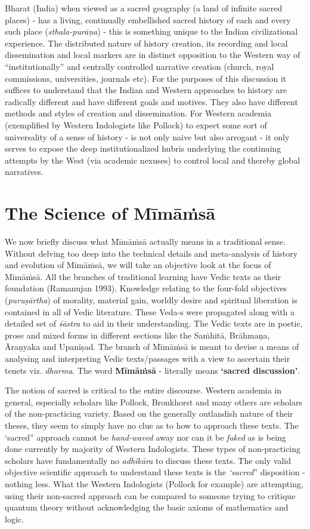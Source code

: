 Bharat (India) when viewed as a sacred geography (a land of infinite sacred places) - has a living, continually embellished sacred history of each and every such place (\textit{sthala-purāṇa}) - this is something unique to the Indian civilizational experience. The distributed nature of history creation, its recording and local dissemination and local markers are in distinct opposition to the Western way of “institutionally” and centrally controlled narrative creation (church, royal commissions, universities, journals etc). For the purposes of this discussion it suffices to understand that the Indian and Western approaches to history are radically different and have different goals and motives. They also have different methods and styles of creation and dissemination. For Western academia (exemplified by Western Indologists like Pollock) to expect some sort of universality of a sense of history - is not only naive but also arrogant - it only serves to expose the deep institutionalized hubris underlying the continuing attempts by the West (via academic nexuses) to control local and thereby global narratives.


\section*{The Science of Mīmāṁsā}

We now briefly discuss what Mīmāṁsā actually means in a traditional sense. Without delving too deep into the technical details and meta-analysis of history and evolution of Mīmāṁsā, we will take an objective look at the focus of Mīmāṁsā. All the branches of traditional learning have Vedic texts as their foundation (Ramanujan 1993). Knowledge relating to the four-fold objectives (\textit{puruṣārtha}) of morality, material gain, worldly desire and spiritual liberation is contained in all of Vedic literature. These Veda-s were propagated along with a detailed set of \textit{śāstra} to aid in their understanding. The Vedic texts are in poetic, prose and mixed forms in different sections like the Saṁhitā, Brāhmaṇa, Āraṇyaka and Upaniṣad. The branch of Mīmāṁsā is meant to devise a means of analysing and interpreting Vedic texts/passages with a view to ascertain their tenets viz. \textit{dharma}. The word \textbf{Mīmāṁsā} - literally means \textbf{‘sacred discussion’}.

The notion of sacred is critical to the entire discourse. Western academia in general, especially scholars like Pollock, Bronkhorst and many others are scholars of the non-practicing variety. Based on the generally outlandish nature of their theses, they seem to simply have no clue as to how to approach these texts. The ‘sacred” approach cannot be \textit{hand-waved} away nor can it be \textit{faked} as is being done currently by majority of Western Indologists. These types of non-practicing scholars have fundamentally no \textit{adhikāra} to discuss these texts. The only valid objective scientific approach to understand these texts is the \textit{‘sacred}” disposition - nothing less. What the Western Indologists (Pollock for example) are attempting, using their non-sacred approach can be compared to someone trying to critique quantum theory without acknowledging the basic axioms of mathematics and logic.

